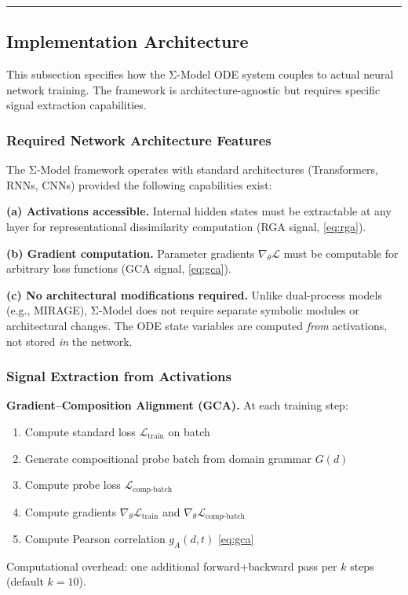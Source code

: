 \documentclass[10pt]{article}
\begin{document}
\noindent\rule{\linewidth}{0.4pt}

\subsection{Implementation Architecture}\label{sec:implementation}

This subsection specifies how the Σ-Model ODE system couples to actual
neural network training. The framework is architecture-agnostic but
requires specific signal extraction capabilities.

\subsubsection{Required Network Architecture Features}

The Σ-Model framework operates with standard architectures (Transformers,
RNNs, CNNs) provided the following capabilities exist:

\textbf{(a) Activations accessible.} Internal hidden states must be
extractable at any layer for representational dissimilarity computation
(RGA signal, \eqref{eq:rga}).

\textbf{(b) Gradient computation.} Parameter gradients $\nabla_\theta
\mathcal{L}$ must be computable for arbitrary loss functions (GCA signal,
\eqref{eq:gca}).

\textbf{(c) No architectural modifications required.} Unlike dual-process
models (e.g., MIRAGE), Σ-Model does not require separate symbolic modules
or architectural changes. The ODE state variables are computed \textit{from}
activations, not stored \textit{in} the network.

\subsubsection{Signal Extraction from Activations}

\textbf{Gradient--Composition Alignment (GCA).} At each training step:
\begin{enumerate}[nosep]
\item Compute standard loss $\mathcal{L}_{\text{train}}$ on batch
\item Generate compositional probe batch from domain grammar $G(d)$
\item Compute probe loss $\mathcal{L}_{\text{comp-batch}}$
\item Compute gradients $\nabla_\theta \mathcal{L}_{\text{train}}$ and $\nabla_\theta \mathcal{L}_{\text{comp-batch}}$
\item Compute Pearson correlation $g_A(d,t)$ \eqref{eq:gca}
\end{enumerate}
Computational overhead: one additional forward+backward pass per $k$ steps
(default $k=10$).
\end{document}
